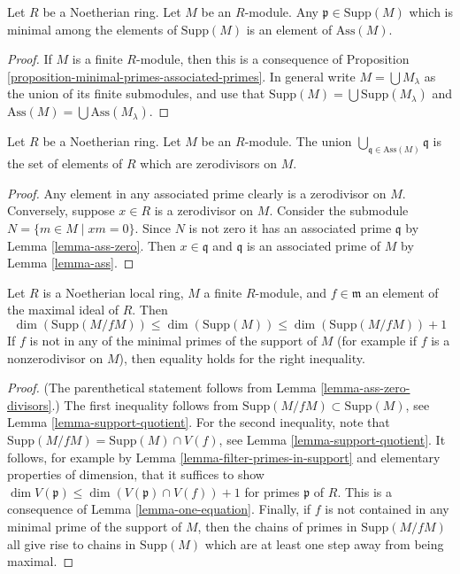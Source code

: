 \begin{lemma}
\label{lemma-ass-minimal-prime-support}
Let $R$ be a Noetherian ring.
Let $M$ be an $R$-module.
Any $\mathfrak p \in \text{Supp}(M)$ which is minimal among the elements
of $\text{Supp}(M)$ is an element of $\text{Ass}(M)$.
\end{lemma}

\begin{proof}
If $M$ is a finite $R$-module, then this is a consequence of
Proposition \ref{proposition-minimal-primes-associated-primes}.
In general write $M = \bigcup M_\lambda$ as the union of its
finite submodules, and use that
$\text{Supp}(M) = \bigcup \text{Supp}(M_\lambda)$
and
$\text{Ass}(M) = \bigcup \text{Ass}(M_\lambda)$.
\end{proof}

\begin{lemma}
\label{lemma-ass-zero-divisors}
Let $R$ be a Noetherian ring.
Let $M$ be an $R$-module.
The union $\bigcup_{\mathfrak q \in \text{Ass}(M)} \mathfrak q$
is the set of elements of $R$ which are zerodivisors on $M$.
\end{lemma}

\begin{proof}
Any element in any associated prime clearly is a zerodivisor on $M$.
Conversely, suppose $x \in R$ is a zerodivisor on $M$.
Consider the submodule $N = \{m \in M \mid xm = 0\}$.
Since $N$ is not zero it has an associated prime $\mathfrak q$ by
Lemma \ref{lemma-ass-zero}.
Then $x \in \mathfrak q$ and $\mathfrak q$
is an associated prime of $M$ by
Lemma \ref{lemma-ass}.
\end{proof}

\begin{lemma}
\label{lemma-one-equation-module}
Let $R$ is a Noetherian local ring, $M$ a finite $R$-module, and
$f \in \mathfrak m$ an element of the maximal ideal of $R$. Then
$$
\dim(\text{Supp}(M/fM)) \leq
\dim(\text{Supp}(M)) \leq
\dim(\text{Supp}(M/fM)) + 1
$$
If $f$ is not in any of the minimal primes of the support of $M$
(for example if $f$ is a nonzerodivisor on $M$), then equality
holds for the right inequality.
\end{lemma}

\begin{proof}
(The parenthetical statement follows from Lemma \ref{lemma-ass-zero-divisors}.)
The first inequality follows from $\text{Supp}(M/fM) \subset \text{Supp}(M)$,
see Lemma \ref{lemma-support-quotient}. For the second inequality, note
that $\text{Supp}(M/fM) = \text{Supp}(M) \cap V(f)$, see
Lemma \ref{lemma-support-quotient}. It follows, for example by
Lemma \ref{lemma-filter-primes-in-support} and elementary properties
of dimension, that it suffices to show
$\dim V(\mathfrak p) \leq \dim (V(\mathfrak p) \cap V(f)) + 1$
for primes $\mathfrak p$ of $R$. This is a consequence of
Lemma \ref{lemma-one-equation}.
Finally, if $f$ is not contained in any minimal
prime of the support of $M$, then the chains of primes in
$\text{Supp}(M/fM)$ all give
rise to chains in $\text{Supp}(M)$ which are at least one step away
from being maximal.
\end{proof}

